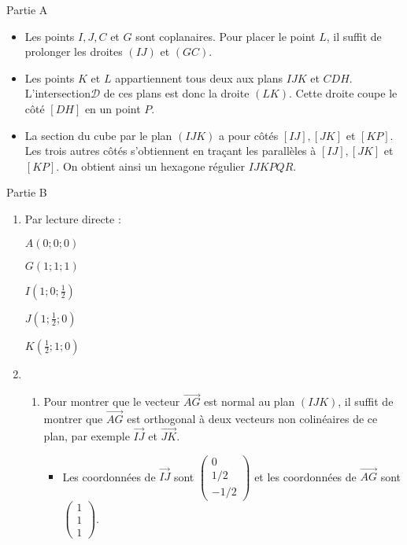 \begin{corrige}
     \begin{h3}Partie A\end{h3}
     \begin{itemize}
          \item
          Les points $I, J,C$ et $G$ sont coplanaires. Pour placer le point $L$, il suffit de prolonger les droites $(IJ)$ et $(GC)$.
          \item
          Les points $K$ et $L$ appartiennent tous deux aux plans $IJK$ et $CDH$. L'intersection$\mathscr{D}$ de ces plans est donc la droite $(LK)$. Cette droite coupe le côté $[DH]$ en un point $P$.
          \item
          La section du cube par le plan $(IJK)$ a pour côtés $[IJ], [JK]$ et $[KP]$. Les trois autres côtés s'obtiennent en traçant les parallèles à $[IJ], [JK]$ et $[KP]$. On obtient ainsi un hexagone régulier $IJKPQR$.
     \end{itemize}
\begin{center}
\end{center}
     \begin{h3}Partie B\end{h3}
     \begin{enumerate}
          \item
          Par lecture directe :
          \par
          $A(0;0;0)$
          \par
          $G(1;1;1)$
          \par
          $I\left(1;0;\frac{1}{2}\right)$
          \par
          $J\left(1;\frac{1}{2};0\right)$
          \par
          $K\left(\frac{1}{2};1;0\right)$
          \item
          \begin{enumerate}[label=\alph*.]
               \item
               Pour montrer que le vecteur $\overrightarrow{AG}$ est normal au plan $(IJK)$, il suffit de montrer que $\overrightarrow{AG}$ est orthogonal à deux vecteurs non colinéaires de ce plan, par exemple $\overrightarrow{IJ}$ et $\overrightarrow{JK}$.
               \begin{itemize}
                    \item
                    Les coordonnées de $\overrightarrow{IJ}$ sont $\begin{pmatrix} 0 \\ 1/2 \\ -1/2 \end{pmatrix}$ et les coordonnées de $\overrightarrow{AG}$ sont $\begin{pmatrix} 1 \\ 1 \\ 1 \end{pmatrix}$.

\end{itemize}
\end{enumerate}
\end{enumerate}
\end{corrige}
